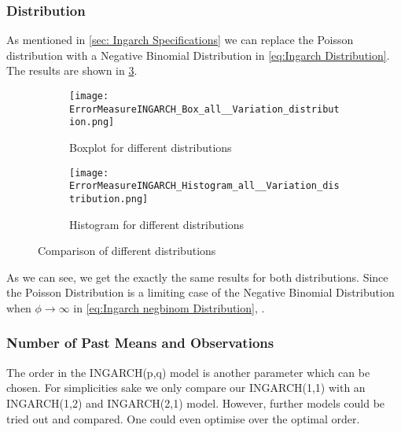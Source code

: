 \subsubsection{Distribution}
\label{sec:Distribution}

As mentioned in \ref{sec: Ingarch Specifications} we can replace the Poisson distribution with a Negative Binomial Distribution in \ref{eq:Ingarch Distribution}. The results are shown in \ref{fig:distributions Comp1}. 

\begin{figure}[htb!]
\centering
\begin{subfigure}[b]{0.45\textwidth}
\texttt{[image: ErrorMeasureINGARCH\_Box\_all\_\_Variation\_distribution.png]}
\caption{Boxplot for different distributions}
\label{fig:distributions Box}
\end{subfigure}
\hfill
\begin{subfigure}[b]{0.45\textwidth}
\texttt{[image: ErrorMeasureINGARCH\_Histogram\_all\_\_Variation\_distribution.png]}
\caption{Histogram for different distributions}
\label{fig:distributions Hist}
\end{subfigure}
\hfill
\caption{Comparison of different distributions}
\label{fig:distributions Comp1}
\end{figure}

As we can see, we get the exactly the same results for both distributions. Since the Poisson Distribution is a limiting case of the Negative Binomial Distribution when $\phi \longrightarrow \infty$ in \ref{eq:Ingarch negbinom Distribution}, \cite{Liboschik:2016}. 


\subsubsection{Number of Past Means and Observations}
\label{sec: Number of Past Means and Observations}

The order in the INGARCH(p,q) model is another parameter which can be chosen. For simplicities sake we only compare our INGARCH(1,1) with an INGARCH(1,2) and INGARCH(2,1) model. However, further models could be tried out and compared. One could even optimise over the optimal order. 


